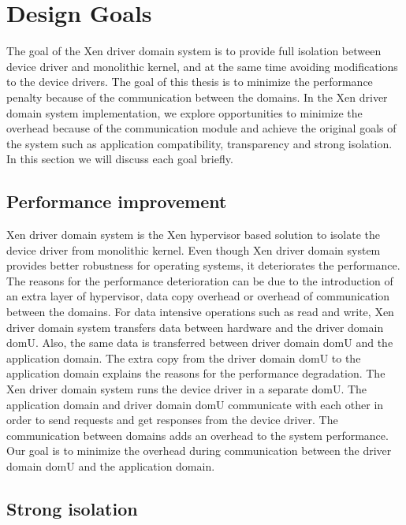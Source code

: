 \section{Design Goals}\label{designgoals}

The goal of the Xen driver domain system is to provide full isolation between device driver and monolithic kernel, and at the same time avoiding modifications to the device drivers. The goal of this thesis is to minimize the performance penalty because of the communication between the domains. In the Xen driver domain system implementation, we explore opportunities to minimize the overhead because of the communication module and achieve the original goals of the system such as application compatibility, transparency and strong isolation. 
\\
In this section we will discuss each goal briefly. 
\\
\subsection{Performance improvement}

Xen driver domain system is the Xen hypervisor based solution to isolate the device driver from monolithic kernel. Even though Xen driver domain system provides better robustness for operating systems, it deteriorates the performance. The reasons for the performance deterioration can be due to the introduction of an extra layer of hypervisor, data copy overhead or overhead of communication between the domains. For data intensive operations such as read and write, Xen driver domain system transfers data between hardware and the driver domain domU. Also, the same data is transferred between driver domain domU and the application domain. The extra copy from the driver domain domU to the application domain explains the reasons for the performance degradation. The Xen driver domain system runs the device driver in a separate domU. The application domain and driver domain domU communicate with each other in order to send requests and get responses from the device driver. The communication between domains adds an overhead to the system performance. Our goal is to minimize the overhead during communication between the driver domain domU and the application domain.

\subsection{Strong isolation}

